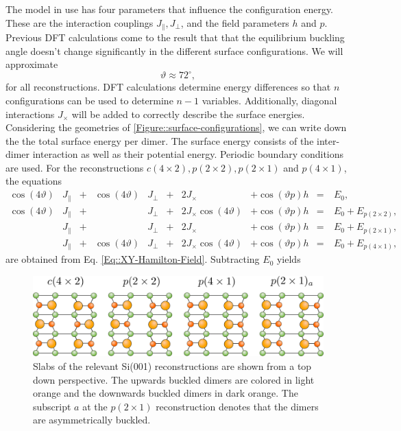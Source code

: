 	The model in use has four parameters that influence the configuration energy. These are the interaction couplings $J_\parallel, J_\perp$, and the field parameters $h$ and $p$. Previous DFT calculations come to the result that that the equilibrium buckling angle doesn't change significantly in the different surface configurations. We will approximate \cite{pillay2004revisit, brand2023critical}
	\begin{equation}
		\vartheta \approx 72^\circ,
	\end{equation}
	for all reconstructions. DFT calculations determine energy differences so that $n$ configurations can be used to determine $n-1$ variables. Additionally, diagonal interactions $J_\times$ will be added to correctly describe the surface energies. Considering the geometries of \autoref{Figure::surface-configurations}, we can write down the the total surface energy per dimer. The surface energy consists of the inter-dimer interaction as well as their potential energy. Periodic boundary conditions are used. For the reconstructions $c(4 \times 2), p(2 \times 2), p(2 \times 1)$ and $p(4\times1)$, the equations
	\begin{equation}
		\begin{split}
			\cos(4\vartheta)&J_\parallel&+& \cos(4\vartheta)&J_\perp &+ &2J_\times &+ \cos \left(\vartheta p\right) h &=~&	E_0, \\
			\cos(4\vartheta)&J_\parallel&+& &J_\perp &+ &2J_\times \cos(4 \vartheta) &+ \cos \left(\vartheta p\right) h &=~&	E_0 + E_{p(2\times 2)}, \\
			&J_\parallel&+& &J_\perp &+ &2J_\times &+ \cos \left(\vartheta p\right) h &=~&	E_0 + E_{p(2\times 1)}, \\
			&J_\parallel&+&\cos\left(4\vartheta \right)&J_\perp &+ &2J_\times \cos(4 \vartheta) &+ \cos \left(\vartheta p\right) h &=~&	E_0 + E_{p(4\times 1)},
		\end{split}
	\end{equation}
	are obtained from Eq. \eqref{Eq::XY-Hamilton-Field}. Subtracting $E_0$ yields
	\begin{figure}[tb]
		\centering
		\includegraphics[width=\textwidth]{graphics/surface-configurations-2.png}
		\caption{Slabs of the relevant Si(001) reconstructions are shown from a top down perspective. The upwards buckled dimers are colored in light orange and the downwards buckled dimers in dark orange. The subscript $a$ at the $p(2 \times 1)$ reconstruction denotes that the dimers are asymmetrically buckled.}
		\label{Figure::surface-configurations}
	\end{figure}	
